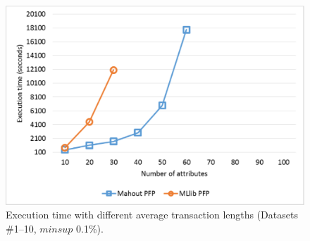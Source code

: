 \documentclass[preprint,review,12pt]{elsarticle}
\begin{document}
\begin{figure}[!t]
\includegraphics[width=5in]{attributes_deeper.eps}
\caption{Execution time with different average transaction lengths %
(Datasets \#1--10, $minsup$ 0.1\%).}
\label{attributes_deeper}
\end{figure}
\end{document}
